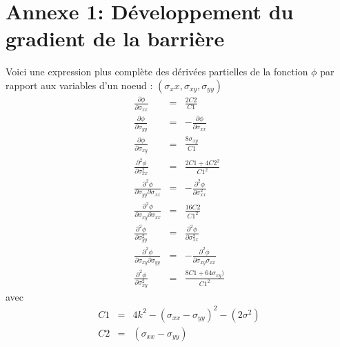\newpage
\section*{Annexe 1: Développement du gradient de la barrière}
Voici une expression plus complète des dérivées partielles de la fonction $\phi$ par rapport aux variables d'un noeud : $(\sigma_xx,\sigma_{xy},\sigma_{yy})$
\begin{eqnarray*}
\frac{\partial \phi}{\partial \sigma_{xx}} & = & \frac{2C2}{C1}\\
\frac{\partial \phi}{\partial \sigma_{yy}} & = & -\frac{\partial \phi}{\partial \sigma_{xx}} \\
\frac{\partial \phi}{\partial \sigma_{xy}} & = & \frac{8\sigma_{xy}}{C1}\\
\frac{\partial^2 \phi}{\partial \sigma_{xx}^2} & = & \frac{2C1+4C2^2}{C1^2} \\
\frac{\partial^2 \phi}{\partial \sigma_{yy}\partial\sigma_{xx}} & = & -\frac{\partial^2 \phi}{\partial \sigma_{xx}^2}\\
\frac{\partial^2 \phi}{\partial \sigma_{xy}\partial\sigma_{xx}} & = & \frac{16C2}{C1^2} \\
\frac{\partial^2 \phi}{\partial \sigma_{yy}^2}& = & \frac{\partial^2 \phi}{\partial \sigma_{xx}^2}\\
\frac{\partial^2 \phi}{\partial \sigma_{xy}\partial \sigma_{yy}}& = & -\frac{\partial^2 \phi}{\partial \sigma_{xy}\sigma_{xx}}\\
\frac{\partial^2 \phi}{\partial \sigma_{xy}^2}& = & \frac{8C1+64\sigma_{xy})}{C1^2}
\end{eqnarray*}
avec 
\begin{eqnarray*}
C1 & = & 4k^2 -(\sigma_{xx}-\sigma_{yy})^2 -(2\sigma^2)\\
C2 & = & (\sigma_{xx}-\sigma_{yy})
\end{eqnarray*}